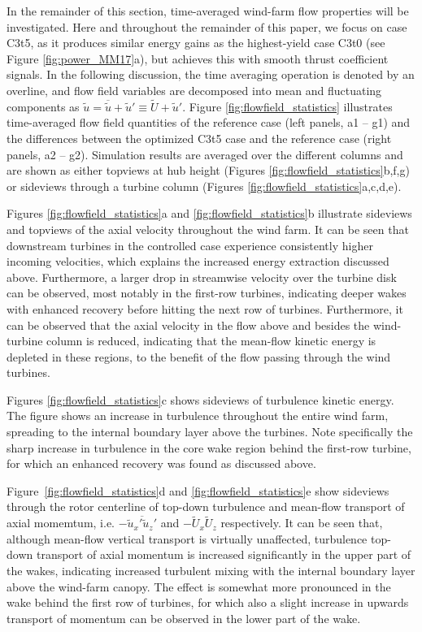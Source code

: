 \documentclass[wes, manuscript]{copernicus}
\begin{document}
In the remainder of this section, time-averaged wind-farm flow properties will be investigated. Here and throughout the remainder of this paper, we focus on case C3t5, as it produces similar energy gains as the highest-yield case C3t0 (see Figure \ref{fig:power_MM17}a), but achieves this with smooth thrust coefficient signals. In the following discussion, the time averaging operation is denoted by an overline, and flow field variables are decomposed into mean and fluctuating components as $\widetilde{u} = \overline{\widetilde{u}} + \widetilde{u}' \equiv \widetilde{U} + \widetilde{u}'  $. Figure \ref{fig:flowfield_statistics} illustrates time-averaged flow field quantities of the reference case (left panels, a1 -- g1) and the differences between the optimized C3t5 case and the reference case (right panels, a2 -- g2). Simulation results are averaged over the different columns and are shown as either topviews at hub height (Figures \ref{fig:flowfield_statistics}b,f,g) or sideviews through a turbine column (Figures \ref{fig:flowfield_statistics}a,c,d,e). 

Figures \ref{fig:flowfield_statistics}a and \ref{fig:flowfield_statistics}b illustrate sideviews and topviews of the axial velocity throughout the wind farm. It can be seen that downstream turbines in the controlled case experience consistently higher incoming velocities, which explains the increased energy extraction discussed above. Furthermore, a larger drop in streamwise velocity over the turbine disk can be observed, most notably in the first-row turbines, indicating deeper wakes with enhanced recovery before hitting the next row of turbines. Furthermore, it can be observed that the axial velocity in the flow above and besides the wind-turbine column is reduced, indicating that the mean-flow kinetic energy is depleted in these regions, to the benefit of the flow passing through the wind turbines. 

Figures \ref{fig:flowfield_statistics}c shows sideviews of turbulence kinetic energy. The figure shows an increase in turbulence throughout the entire wind farm, spreading to the internal boundary layer above the turbines. Note specifically the sharp increase in turbulence in the core wake region behind the first-row turbine, for which an enhanced recovery was found as discussed above. 

Figure~\ref{fig:flowfield_statistics}d and \ref{fig:flowfield_statistics}e show sideviews through the rotor centerline of top-down turbulence and mean-flow transport of axial momemtum, i.e. $-\overline{\widetilde{u}_x' \widetilde{u}_z'}$ and $- \widetilde{U}_x \widetilde{U}_z$ respectively. It can be seen that, although mean-flow vertical transport is virtually unaffected, turbulence top-down transport of axial momentum is increased significantly in the upper part of the wakes, indicating increased turbulent mixing with the internal boundary layer above the wind-farm canopy. The effect is somewhat more pronounced in the wake behind the first row of turbines, for which also a slight increase in upwards transport of momentum can be observed in the lower part of the wake. 
\end{document}
